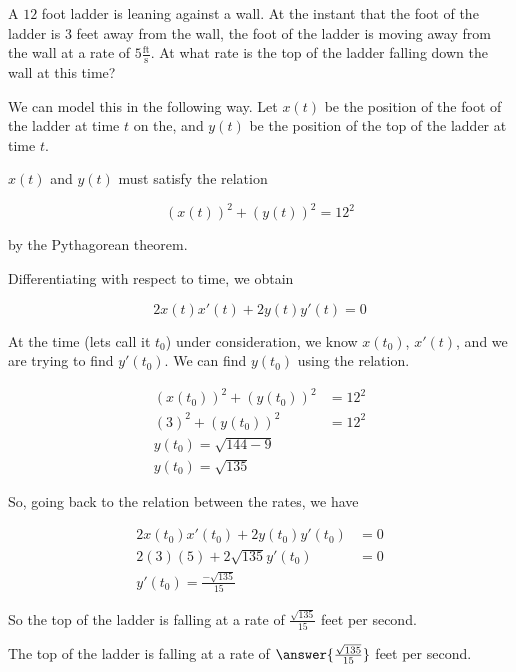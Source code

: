 \documentclass{ximera}
\author{Steven Gubkin}
\begin{document}
\begin{exercise}



A $12$ foot ladder is leaning against a wall.  At the instant that the foot of the ladder is $3$ feet away from the wall, the foot of the ladder is moving away from the wall at a rate of $5 \frac{\textrm{ft}}{\textrm{s}}$.  At what rate is the top of the ladder falling down the wall at this time?

\begin{hint}
We can model this in the following way.  Let $x(t)$ be the position of the foot of the ladder at time $t$ on the, and $y(t)$ be the position of the top of the ladder at time $t$. 
\end{hint}

\begin{hint}
	$x(t)$ and $y(t)$ must satisfy the relation

\[
\left( x(t) \right)^2 + \left( y(t)\right)^2 = 12^2
\]

by the Pythagorean theorem.
\end{hint}

\begin{hint}
	Differentiating with respect to time, we obtain

\[
2x(t)x'(t)+2y(t)y'(t) = 0
\]
\end{hint}

\begin{hint}
	At the time (lets call it $t_0$) under consideration, we know $x(t_0)$, $x'(t)$, and we are trying to find $y'(t_0)$.  We can find $y(t_0)$ using the relation.  

\begin{align*}
	\left( x(t_0) \right)^2 + \left( y(t_0)\right)^2 &= 12^2\\
	\left( 3 \right)^2 + \left( y(t_0)\right)^2 &= 12^2\\
	y(t_0) = \sqrt{144-9}\\
	y(t_0) = \sqrt{135}
\end{align*}
\end{hint}

\begin{hint}
	So, going back to the relation between the rates, we have

\begin{align*}
2x(t_0)x'(t_0)+2y(t_0)y'(t_0) &= 0\\
2(3)(5)+2\sqrt{135}y'(t_0) &=0\\
y'(t_0) = \frac{-\sqrt{135}}{15}
\end{align*}

So the top of the ladder is falling at  a rate of $\frac{\sqrt{135}}{15}$ feet per second.

\end{hint}

\begin{prompt}
	The top of the ladder is falling at a rate of $\answer{\frac{\sqrt{135}}{15}}$ feet per second.
\end{prompt}

\end{exercise}
\end{document}
